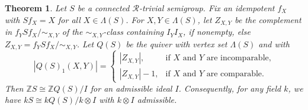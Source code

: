 \documentclass[reqno,11pt]{amsart}
\newtheorem{Thm}{Theorem}[section]
\numberwithin{equation}{section}
\begin{document}
\begin{Thm}
    Let $S$ be a connected $\mathscr R$-trivial semigroup.  Fix an idempotent $f_X$ with $Sf_X=X$ for all $X\in \Lambda(S)$.  For $X,Y\in \Lambda(S)$, let $Z_{X,Y}$ be the complement in $f_YSf_X/{{\sim_{X,Y}}}$ of the $\sim_{X,Y}$-class containing $I_YI_X$, if nonempty, else $Z_{X,Y}=f_YSf_X/{{\sim_{X,Y}}}$.  Let $Q(S)$ be the quiver with vertex set $\Lambda(S)$ and with 
\[|Q(S)_1(X,Y)|  =\begin{cases}
    |Z_{X,Y}|, &  \text{if $X$ and $Y$  are incomparable,}\\
    |Z_{X,Y}|-1, & \text{if $X$ and $Y$ are comparable.}
\end{cases}\]      Then $\mathbb ZS\cong \mathbb ZQ(S)/I$ for an admissible ideal $I$.
Consequently, for any field $k$, we have $kS\cong kQ(S)/k\otimes I$ with $k\otimes I$ admissible.
\end{Thm}



\end{document}
